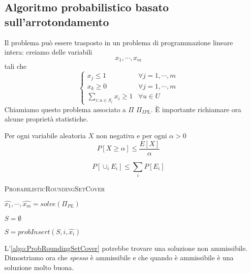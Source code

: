 \subsection{Algoritmo probabilistico basato sull'arrotondamento}
Il problema può essere trasposto in un problema di programmazione lineare intera:
creiamo delle variabili
$$
	x_1, \cdots, x_m
$$
tali che
$$
	\begin{cases}
		x_j \leq 1                     & \forall j = 1, \cdots, m \\
		x_k \geq 0                     & \forall j = 1, \cdots, m \\
		\sum_{i: u \in S_i} x_i \geq 1 & \forall u \in U
	\end{cases}
$$
Chiamiamo questo problema associato a $\Pi$  $\Pi_{IPL}$. \`E
importante richiamare ora alcune proprietà statistiche.
\begin{theorem}\label{thm:markov}
	Per ogni variabile aleatoria $X$ non negativa e per ogni $\alpha > 0$
	$$
		P[X \geq \alpha] \leq \frac{E[X]}{\alpha}
	$$
\end{theorem}

\begin{theorem}\label{thm:boole}
	$$
		P[\cup_{i} E_i] \leq \sum_i P[E_i]
	$$
\end{theorem}

\begin{algorithm}[h]
	\caption{\textsc{ProbabilisticRoundingSetCover}}
	\label{algo:ProbRoundingSetCover}

	$\hat{x_1}, \cdots, \hat{x_m} = solve(\Pi_{PL}) $

	$S =  \emptyset$

	{

		{
			$S = probInsert(S, i, \hat{x_i})$
		}
	}

\end{algorithm}

L'\cref{algo:ProbRoundingSetCover} potrebbe trovare una soluzione non ammissibile. Dimostriamo
ora che \textit{spesso} è ammissibile e che quando è ammissibile è una soluzione molto buona.

